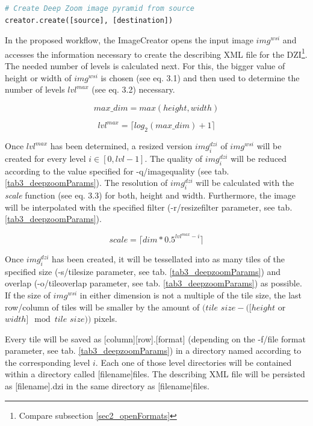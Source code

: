 \begin{lstlisting}[frame=single, language=python]
# Create Deep Zoom image pyramid from source
creator.create([source], [destination])
\end{lstlisting}

In the proposed workflow, the ImageCreator opens the input image $img^{wsi}$ and accesses the information necessary to create the describing XML file for the DZI\footnote{Compare subsection \ref{sec2_openFormats}}. The needed number of levels is calculated next. For this, the bigger value of height or width of $img^{wsi}$ is chosen (see eq. 3.1) and then used to determine the number of levels $lvl^{max}$ (see eq. 3.2) necessary.

\begin{equation}
	max{\_}dim = max(height, width)
\end{equation}

\begin{equation}
	lvl^{max} = {\lceil}log_2(max{\_}dim) + 1\rceil
\end{equation}

Once $lvl^{max}$ has been determined, a resized version $img^{dzi}_i$ of $img^{wsi}$ will be created for every level $i \in [0, lvl-1]$. The quality of $img^{dzi}_i$ will be reduced according to the value specified for -q/image{\textunderscore}quality (see tab. \ref{tab3_deepzoomParams}). The resolution of $img^{dzi}_i$ will be calculated with the \emph{scale} function (see eq. 3.3) for both, height and width. Furthermore, the image will be interpolated with the specified filter (-r/resize{\textunderscore}filter parameter, see tab. \ref{tab3_deepzoomParams}).

\begin{equation}
	scale = {\lceil}dim * 0.5^{lvl^{max}-i}\rceil
\end{equation}

Once $img^{dzi}_i$ has been created, it will be tessellated into as many tiles of the specified size (-s/tile{\textunderscore}size parameter, see tab. \ref{tab3_deepzoomParams}) and overlap (-o/tile{\textunderscore}overlap parameter, see tab. \ref{tab3_deepzoomParams}) as possible. If the size of $img^{wsi}$ in either dimension is not a multiple of the tile size, the last row/column of tiles will be smaller by the amount of $(tile$ $size - ([height$ or $width] \mod tile$ $size))$ pixels.

Every tile will be saved as [column]{\textunderscore}[row].[format] (depending on the -f/file{\textunderscore} format parameter, see tab. \ref{tab3_deepzoomParams}) in a directory named according to the corresponding level $i$. Each one of those level directories will be contained within a directory called [filename]{\textunderscore}files. The describing XML file will be persisted as [filename].dzi in the same directory as [filename]{\textunderscore}files.


